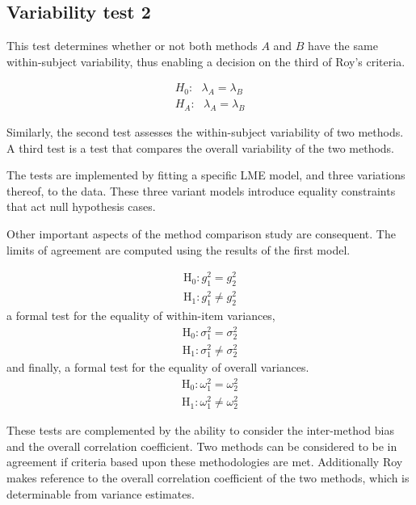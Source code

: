 \documentclass[12pt, a4paper]{report}
\theoremstyle{plain}
\theoremstyle{definition}
\theoremstyle{remark}
\begin{document}
	\subsection*{Variability test 2}
	
	This test determines whether or not both methods $A$ and $B$ have the same within-subject variability, thus enabling a decision on the third of Roy's criteria.
	
	\begin{eqnarray*}
		H_{0}: \mbox{ }\lambda_{A}  = \lambda_{B} \\
		H_{A}: \mbox{ }\lambda_{A}  = \lambda_{B}
	\end{eqnarray*}
	
	Similarly, the second test
	assesses the within-subject variability of two methods. A third test is a test that compares the overall variability of the two methods.
	
	The tests are implemented by fitting a specific LME model, and three variations thereof, to the data. These three variant models introduce equality constraints that act null hypothesis cases.
	
	Other important aspects of the method comparison study are consequent. The limits of agreement are computed using the results of the first model.
	
	
	\begin{eqnarray*}
		\operatorname{H_0} : g^2_1 = g^2_2 \\
		\operatorname{H_1} : g^2_1 \neq g^2_2
	\end{eqnarray*}
	a formal test for the equality of within-item variances,
	\begin{eqnarray*}
		\operatorname{H_0} : \sigma^2_1 = \sigma^2_2 \\
		\operatorname{H_1} : \sigma^2_1 \neq \sigma^2_2
	\end{eqnarray*}
	and finally, a formal test for the equality of overall variances.
	\begin{eqnarray*}
		\operatorname{H_0} : \omega^2_1 = \omega^2_2 \\
		\operatorname{H_1} : \omega^2_1 \neq \omega^2_2
	\end{eqnarray*}
	
	
	These tests are complemented by the ability to consider the inter-method bias and the overall correlation coefficient.
	Two methods can be considered to be in agreement if criteria based upon these methodologies are met. Additionally Roy makes reference to the overall correlation coefficient of the two methods, which is determinable from variance estimates.
	
\end{document}
